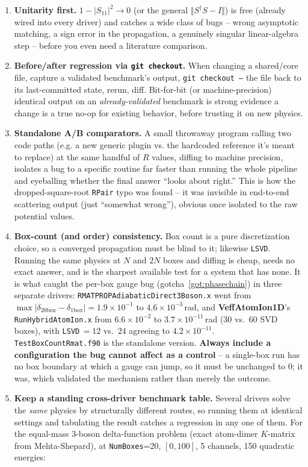 \documentclass[11pt]{article}
\newcommand{\file}[1]{\texttt{#1}}
\newcommand{\repo}[1]{\textbf{#1}}
\begin{document}
\begin{enumerate}
\item \textbf{Unitarity first.} $1-|S_{11}|^2\to0$ (or the general $\Vert S^\dagger S-I\Vert$) is
  free (already wired into every driver) and catches a wide class of bugs -- wrong asymptotic
  matching, a sign error in the propagation, a genuinely singular linear-algebra step -- before
  you even need a literature comparison.
\item \textbf{Before/after regression via \texttt{git checkout}.} When changing a shared/core
  file, capture a validated benchmark's output, \texttt{git checkout --} the file back to its
  last-committed state, rerun, diff. Bit-for-bit (or machine-precision) identical output on an
  \emph{already-validated} benchmark is strong evidence a change is a true no-op for existing
  behavior, before trusting it on new physics.
\item \textbf{Standalone A/B comparators.} A small throwaway program calling two code paths (e.g.
  a new generic plugin vs. the hardcoded reference it's meant to replace) at the same handful of
  $R$ values, diffing to machine precision, isolates a bug to a specific routine far faster than
  running the whole pipeline and eyeballing whether the final answer ``looks about right.'' This
  is how the dropped-square-root \texttt{RPair} typo was found -- it was invisible in
  end-to-end scattering output (just ``somewhat wrong''), obvious once isolated to the raw
  potential values.
\item \textbf{Box-count (and order) consistency.} Box count is a pure discretization choice, so a
  converged propagation must be blind to it; likewise \texttt{LSVD}. Running the same physics at
  $N$ and $2N$ boxes and diffing is cheap, needs no exact answer, and is the sharpest available
  test for a system that has none. It is what caught the per-box gauge bug
  (gotcha~\ref{got:phasechain}) in three separate drivers: \file{RMATPROPAdiabaticDirect3Boson.x}
  went from $\max|\delta_{20\text{box}}-\delta_{1\text{box}}|=1.9\times10^{-1}$ to
  $4.6\times10^{-3}$\,rad, and \repo{VeffAtomIon1D}'s \file{RunHybridAtomIon.x} from
  $6.6\times10^{-2}$ to $3.7\times10^{-11}$\,rad (30 vs.\ 60 SVD boxes), with
  \texttt{LSVD}$\,=12$ vs.\ $24$ agreeing to $4.2\times10^{-11}$. \file{TestBoxCountRmat.f90} is
  the standalone version. \textbf{Always include a configuration the bug cannot affect as a
  control} -- a single-box run has no box boundary at which a gauge can jump, so it must be
  unchanged to $0$; it was, which validated the mechanism rather than merely the outcome.
\item \textbf{Keep a standing cross-driver benchmark table.} Several drivers solve the
  \emph{same} physics by structurally different routes, so running them at identical settings and
  tabulating the result catches a regression in any one of them. For the equal-mass 3-boson
  delta-function problem (exact atom-dimer $K$-matrix from Mehta-Shepard), at
  \texttt{NumBoxes}=20, $[0,100]$, 5 channels, 150 quadratic energies:


\end{enumerate}
\end{document}

